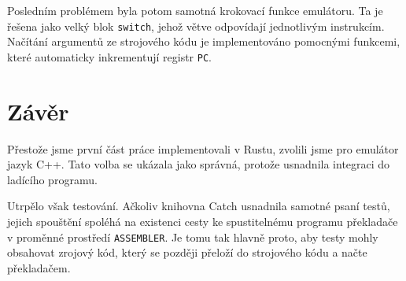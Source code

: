 Posledním problémem byla potom samotná krokovací funkce emulátoru. Ta je řešena jako velký blok \texttt{switch}, jehož větve odpovídají jednotlivým instrukcím. Načítání argumentů ze strojového kódu je implementováno pomocnými funkcemi, které automaticky inkrementují registr \texttt{PC}.

\section{Závěr}

Přestože jsme první část práce implementovali v Rustu, zvolili jsme pro emulátor jazyk C++. Tato volba se ukázala jako správná, protože usnadnila integraci do ladícího programu.

Utrpělo však testování. Ačkoliv knihovna Catch usnadnila samotné psaní testů, jejich spouštění spoléhá na existenci cesty ke spustitelnému programu překladače v proměnné prostředí \texttt{ASSEMBLER}. Je tomu tak hlavně proto, aby testy mohly obsahovat zrojový kód, který se později přeloží do strojového kódu a načte překladačem.